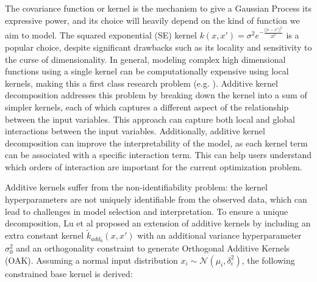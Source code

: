 \documentclass{IOS-Book-Article}
\begin{document}
The covariance function or kernel is the mechanism to give a Gaussian Process its expressive power, and its choice will heavily depend on the kind of function we aim to model\cite{kernel-composition}. The squared exponential (SE) kernel $k(x,x') = \sigma^2 e^{-\frac{||x-x'||^2}{2l^2}}$ is a popular choice, despite significant drawbacks such as its locality and sensitivity to the curse of dimensionality\cite{curse-dimensionality}.
In general, modeling complex high dimensional functions using a single kernel can be computationally expensive using local kernels, making this a first class research problem (e.g. \cite{gp-high-dim}\cite{gp-high-dim2}).
Additive kernel decomposition\cite{gp-additive} addresses this problem by breaking down the kernel into a sum of simpler kernels, each of which captures a different aspect of the relationship between the input variables. This approach can capture both local and global interactions between the input variables. Additionally, additive kernel decomposition can improve the interpretability of the model, as each kernel term can be associated with a specific interaction term. This can help users understand which orders of interaction are important for the current optimization problem. 




Additive kernels suffer from the non-identifiability problem: the kernel hyperparameters are not uniquely identifiable from the observed data, which can lead to challenges in model selection and interpretation.
To ensure a unique decomposition, Lu et al\cite{gp-additive-orthogonal} proposed an extension of additive kernels by including an extra constant kernel $\tilde{k}_{add_0}(x,x')$ with an additional variance hyperparameter $\sigma_0^2$ and an orthogonality constraint to generate Orthogonal Additive Kernels (OAK)\cite{gp-additive-orthogonal}. Assuming a normal input distribution $x_i \sim \mathcal{N}(\mu_i, \delta_i^2)$, the following constrained base kernel is derived:
\end{document}
